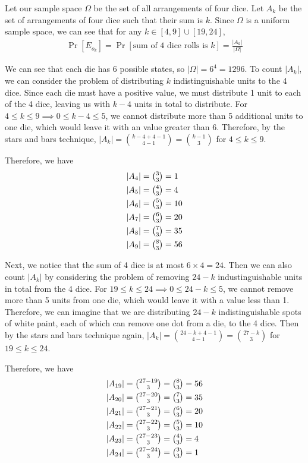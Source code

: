 \documentclass{article}
\theoremstyle{definition}
\theoremstyle{plain}
\begin{document}
	Let our sample space $\Omega$ be the set of all arrangements of four dice. Let $A_k$ be the set of arrangements of four dice such that their sum is $k$. Since $\Omega$ is a uniform sample space, we can see that for any $k \in [4, 9] \cup [19, 24]$, 
\begin{align}\Pr[E_{o_k}] = \Pr[\text{sum of 4 dice rolls is $k$}] = \frac{|A_k|}{|\Omega|}\end{align}

	We can see that each die has 6 possible states, so $|\Omega| = 6^4 = 1296$. To count $|A_k|$, we can consider the problem of distributing $k$ indistinguishable units to the 4 dice. Since each die must have a positive value, we must distribute 1 unit to each of the 4 dice, leaving us with $k-4$ units in total to distribute. For $4 \leq k \leq 9 \implies 0 \leq k - 4 \leq 5$, we cannot distribute more than 5 additional units to one die, which would leave it with an value greater than 6. Therefore, by the stars and bars technique, $|A_k| = \binom{k - 4 + 4 - 1}{4 - 1} = \binom{k - 1}{3}$ for $4 \leq k \leq 9$.

	Therefore, we have
	\begin{align*}
		&|A_4| = \tbinom{3}{3} = 1\\
		&|A_5| = \tbinom{4}{3} = 4\\
		&|A_6| = \tbinom{5}{3} = 10\\
		&|A_7| = \tbinom{6}{3} = 20\\
		&|A_8| = \tbinom{7}{3} = 35\\
		&|A_9| = \tbinom{8}{3} = 56
	\end{align*}

	Next, we notice that the sum of 4 dice is at most $6 \times 4 = 24$. Then we can also count $|A_k|$ by considering the problem of removing $24 - k$ industinguishable units in total from the 4 dice. For $19 \leq k \leq 24 \implies 0 \leq 24 - k \leq 5$, we cannot remove more than 5 units from one die, which would leave it with a value less than 1. Therefore, we can imagine that we are distributing $24 - k$ indistinguishable spots of white paint, each of which can remove one dot from a die, to the 4 dice. Then by the stars and bars technique again, $|A_k| = \binom{24 - k + 4 - 1}{4 - 1} = \binom{27 - k}{3}$ for $19 \leq k \leq 24$.

	Therefore, we have
	\begin{align*}
		&|A_{19}| = \tbinom{27 - 19}{3} = \tbinom{8}{3} = 56\\
		&|A_{20}| = \tbinom{27 - 20}{3} = \tbinom{7}{3} = 35\\
		&|A_{21}| = \tbinom{27 - 21}{3} = \tbinom{6}{3} = 20\\
		&|A_{22}| = \tbinom{27 - 22}{3} = \tbinom{5}{3} = 10\\
		&|A_{23}| = \tbinom{27 - 23}{3} = \tbinom{4}{3} = 4\\
		&|A_{24}| = \tbinom{27 - 24}{3} = \tbinom{3}{3} = 1
	\end{align*}
\end{document}
